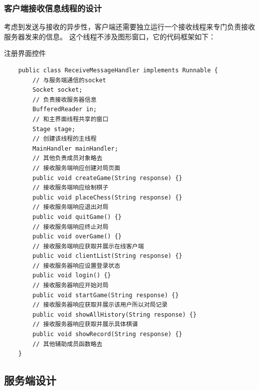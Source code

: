 \documentclass[utf8]{article}
\begin{document}
\subsubsection{客户端接收信息线程的设计}
考虑到发送与接收的异步性，客户端还需要独立运行一个接收线程来专门负责接收服务器发来的信息。
这个线程不涉及图形窗口，它的代码框架如下：
\begin{listing}[H]
    \caption{注册界面控件}
    \begin{verbatim}
    public class ReceiveMessageHandler implements Runnable {
        // 与服务端通信的socket
        Socket socket;
        // 负责接收服务器信息
        BufferedReader in;
        // 和主界面线程共享的窗口
        Stage stage;
        // 创建该线程的主线程
        MainHandler mainHandler;
        // 其他负责成员对象略去
        // 接收服务端响应创建对局页面
        public void createGame(String response) {}
        // 接收服务端响应绘制棋子
        public void placeChess(String response) {}
        // 接收服务端响应退出对局
        public void quitGame() {}
        // 接收服务端响应终止对局
        public void overGame() {}
        // 接收服务端响应获取并展示在线客户端
        public void clientList(String response) {}
        // 接收服务器响应设置登录状态
        public void login() {}
        // 接收服务器响应开始对局
        public void startGame(String response) {}
        // 接收服务器响应获取并展示该用户所以对局记录
        public void showAllHistory(String response) {}
        // 接收服务器响应获取并展示具体棋谱
        public void showRecord(String response) {}
        // 其他辅助成员函数略去
    }
    \end{verbatim}
\end{listing}
\subsection{服务端设计}
\end{document}

